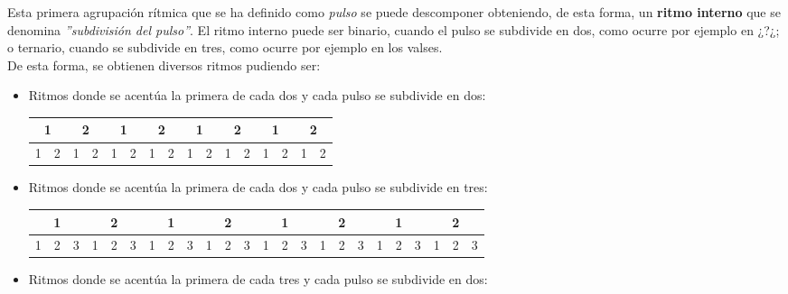 \documentclass[a4paper, openright, 11pt, titlepage]{report}
\theoremstyle{definition}\newtheorem{defin}[propo]{Definition}
\theoremstyle{definition}\newtheorem{obser}[propo]{Remark}
\theoremstyle{definition}\newtheorem{ejem}[propo]{Ejemplo}
\theoremstyle{definition}\newtheorem{algoritmo}[propo]{Algoritmo}
\begin{document}
Esta primera agrupación rítmica que se ha definido como \textit{pulso} se puede descomponer obteniendo, de esta forma, un \textbf{ritmo interno} que se denomina \textit{''subdivisión del pulso''}. El ritmo interno puede ser binario, cuando el pulso se subdivide en dos, como ocurre por ejemplo en ¿?¿; o ternario, cuando se subdivide en tres, como ocurre por ejemplo en los valses.\\
De esta forma, se obtienen diversos ritmos pudiendo ser:
\begin{itemize}
    \item Ritmos donde se acentúa la primera de cada dos y cada pulso se subdivide en dos:
    \begin{table}[H]
    \centering
    \begin{tabular}{|c|c|c|c|c|c|c|c|c|c|c|c|c|c|c|c|}
    \hline
        \multicolumn{2}{|c}{\cellcolor{acento}1} & \multicolumn{2}{|c}{2} & \multicolumn{2}{|c}{\cellcolor{acento}1} & \multicolumn{2}{|c}{2} & \multicolumn{2}{|c}{\cellcolor{acento}1} & \multicolumn{2}{|c}{2} & \multicolumn{2}{|c}{\cellcolor{acento}1} & \multicolumn{2}{|c|}{2} \\
        \hline
        \cellcolor{acento}1 & 2 & 1 & 2 & \cellcolor{acento}1 & 2 & 1 & 2 & \cellcolor{acento}1 & 2 & 1 & 2 & \cellcolor{acento}1 & 2 & 1 & 2\\
        \hline
    \end{tabular}
\end{table}
    \item Ritmos donde se acentúa la primera de cada dos y cada pulso se subdivide en tres:
    \begin{table}[H]
    \centering
    \begin{tabular}{|c|c|c|c|c|c|c|c|c|c|c|c|c|c|c|c|c|c|c|c|c|c|c|c|}
    \hline
        \multicolumn{3}{|c}{\cellcolor{acento}1} & \multicolumn{3}{|c}{2} & \multicolumn{3}{|c}{\cellcolor{acento}1} & \multicolumn{3}{|c}{2} & \multicolumn{3}{|c}{\cellcolor{acento}1} & \multicolumn{3}{|c}{2} & \multicolumn{3}{|c}{\cellcolor{acento}1} & \multicolumn{3}{|c|}{2} \\
        \hline
        \cellcolor{acento}1 & 2 & 3 & 1 & 2 & 3 & \cellcolor{acento}1 & 2 & 3 & 1 & 2 & 3 & \cellcolor{acento}1 & 2 & 3 & 1 & 2 & 3 & \cellcolor{acento}1 & 2 & 3 & 1 & 2 & 3 \\
        \hline
    \end{tabular}
\end{table}
    \item Ritmos donde se acentúa la primera de cada tres y cada pulso se subdivide en dos:

\end{itemize}
\end{document}
